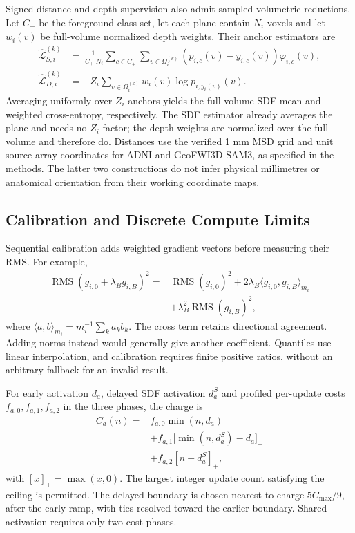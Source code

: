 Signed-distance and depth supervision also admit sampled volumetric
reductions. Let $C_+$ be the foreground class set, let each plane
contain $N_i$ voxels and let $w_i(v)$ be full-volume normalized depth
weights. Their anchor estimators are
\begin{align}
\widehat{\mathcal L}_{S,i}^{(k)}
 &=\frac{1}{|C_+|N_i}\sum_{c\in C_+}
   \sum_{v\in\Omega_i^{(k)}}(p_{i,c}(v)-y_{i,c}(v))\varphi_{i,c}(v),
   \label{eq:medsam-sampled-sdf}\\
\widehat{\mathcal L}_{D,i}^{(k)}
 &=-Z_i\sum_{v\in\Omega_i^{(k)}}w_i(v)\log p_{i,y_i(v)}(v).
   \label{eq:medsam-sampled-depth}
\end{align}
Averaging uniformly over $Z_i$ anchors yields the full-volume SDF mean
and weighted cross-entropy, respectively. The SDF estimator already
averages the plane and needs no $Z_i$ factor; the depth weights are
normalized over the full volume and therefore do. Distances use the
verified 1 mm MSD grid and unit source-array coordinates for ADNI and
GeoFWI3D SAM3, as specified in the methods. The latter two constructions
do not infer physical millimetres or anatomical orientation from their
working coordinate maps.

\subsection{Calibration and Discrete Compute Limits}

Sequential calibration adds weighted gradient vectors before measuring
their RMS. For example,
\begin{equation}
\begin{aligned}
\operatorname{RMS}(g_{i,0}+\lambda_B g_{i,B})^2
={}&\operatorname{RMS}(g_{i,0})^2
 +2\lambda_B\langle g_{i,0},g_{i,B}\rangle_{m_i}\\
 &+\lambda_B^2\operatorname{RMS}(g_{i,B})^2,
\end{aligned}
\label{eq:calibration-cross-term}
\end{equation}
where $\langle a,b\rangle_{m_i}=m_i^{-1}\sum_k a_kb_k$.
The cross term retains directional agreement. Adding norms instead
would generally give another coefficient. Quantiles use linear
interpolation, and calibration requires finite positive ratios,
without an arbitrary fallback for an invalid result.

For early activation $d_a$, delayed SDF activation $d_a^S$ and
profiled per-update costs $f_{a,0},f_{a,1},f_{a,2}$ in the three
phases, the charge is
\begin{equation}
\begin{aligned}
C_a(n)={}&f_{a,0}\min(n,d_a)\\
 &+f_{a,1}\bigl[\min(n,d_a^S)-d_a\bigr]_+\\
 &+f_{a,2}[n-d_a^S]_+,
\end{aligned}
\label{eq:piecewise-optimization-cost}
\end{equation}
with $[x]_+=\max(x,0)$. The largest integer update count satisfying
the ceiling is permitted. The delayed boundary is chosen nearest
to charge $5C_{\max}/9$, after the early ramp, with ties resolved
toward the earlier boundary. Shared activation requires only two
cost phases.

